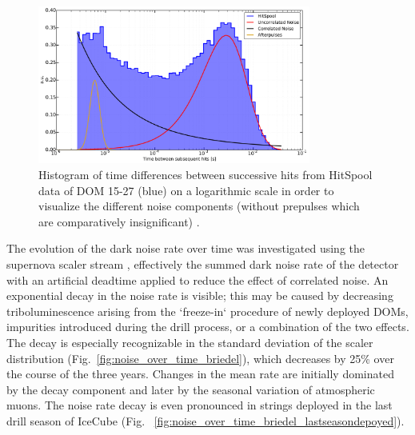 \begin{figure}[!h]
 \centering
  \includegraphics[width=0.8\textwidth]{graphics/dom/performance/darknoise/SingleDOM_HitSpool_Hits_deltaT_fits_example.pdf}
 \caption{Histogram of time differences between successive hits from HitSpool data of
DOM 15-27 (blue) on a logarithmic scale in order to visualize the different noise components
(without prepulses which are comparatively insignificant) \cite{heereman2015hitspooling}.}
 \label{fig:darknoise_deltaT_components}
\end{figure}

The evolution of the dark noise rate over time was investigated using the
supernova scaler stream \cite{IC3:supernova, briedel_phd}, effectively 
the summed dark noise rate of the detector with an artificial deadtime
applied to reduce the effect of correlated noise. An exponential decay in
the noise rate is visible; this may be caused by 
decreasing triboluminescence arising from the `freeze-in`
procedure of newly deployed DOMs, impurities introduced during the drill
process, or a combination of the two effects.  The decay
is especially recognizable in the standard deviation of the scaler
distribution (Fig.~\ref{fig:noise_over_time_briedel}), which decreases by
25\% over the course of the three years. Changes in the mean rate are
initially dominated by the decay component and later by the seasonal
variation of atmospheric muons.  The noise rate decay is even pronounced
in strings deployed in the last drill season of IceCube (Fig.~
\ref{fig:noise_over_time_briedel_lastseasondepoyed}). 


